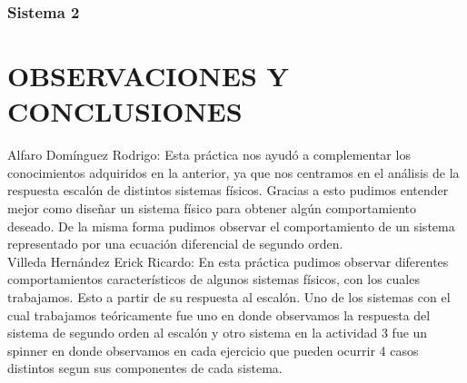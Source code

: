 \subsubsection{Sistema 2}

\section{OBSERVACIONES Y CONCLUSIONES}
Alfaro Domínguez Rodrigo: Esta práctica nos ayudó a complementar los conocimientos adquiridos en la anterior, ya que nos centramos en el análisis de la respuesta escalón de distintos sistemas físicos. Gracias a esto pudimos entender mejor como diseñar un sistema físico para obtener algún comportamiento deseado. De la misma forma pudimos observar el comportamiento de un sistema representado por una ecuación diferencial de segundo orden.\\

Villeda Hernández Erick Ricardo: En esta práctica pudimos observar diferentes comportamientos característicos de algunos sistemas físicos, con los cuales trabajamos. Esto a partir de su respuesta al escalón. Uno de los sistemas con el cual trabajamos teóricamente fue uno en donde observamos la respuesta del sistema de segundo orden al escalón y otro sistema en la actividad 3 fue un spinner en donde observamos en cada ejercicio que pueden ocurrir 4 casos distintos segun sus componentes de cada sistema.
